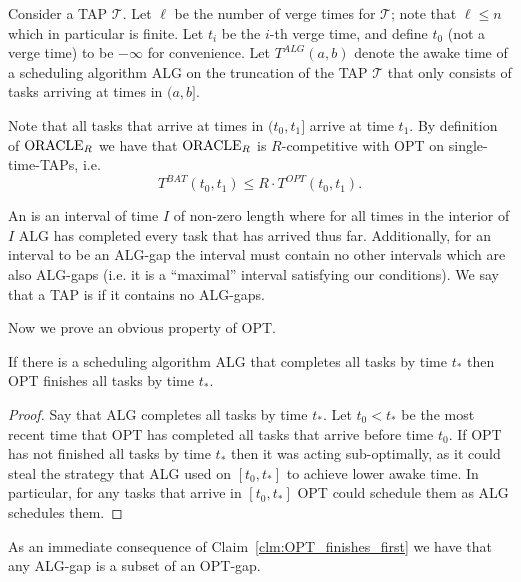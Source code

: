 Consider a TAP $\mathcal{T}$. Let $\ell$ be the number of verge
times for $\mathcal{T}$; note that $\ell \le n$ which in
particular is finite. Let $t_i$ be the $i$-th verge time, and
define $t_0$ (not a verge time) to be $-\infty$ for convenience.
Let $T^{ALG}(a, b)$ denote the awake time of a scheduling algorithm
ALG on the truncation of the TAP $\mathcal{T}$ that only consists
of tasks arriving at times in $(a, b]$.

Note that all tasks that arrive at times in $(t_0, t_1]$ arrive
at time $t_1$. By definition of $\operatorname{\text{ORACLE}}_R$ we have that
$\operatorname{\text{ORACLE}}_R$ is $R$-competitive with OPT on single-time-TAPs, i.e.
\begin{equation}
  \label{eq:same_single}
  T^{BAT}(t_0,t_1) \le R \cdot T^{OPT}(t_0,t_1).
\end{equation}

An  is an interval of time $I$ of non-zero length where for
all times in the interior of $I$ ALG has completed every
task that has arrived thus far. Additionally, for an interval to
be an ALG-gap the interval must contain no other intervals which
are also ALG-gaps (i.e. it is a \enquote{maximal} interval
satisfying our conditions).
We say that a TAP is  if it contains no ALG-gaps.

Now we prove an obvious property of OPT.
\begin{claim}
  \label{clm:OPT_finishes_first}
  If there is a scheduling algorithm ALG that completes all tasks by
  time $t_*$ then OPT finishes all tasks by time $t_*$.
\end{claim}
\begin{proof}
  Say that ALG completes all tasks by time $t_*$. Let $t_0 < t_*$
  be the most recent time that OPT has completed all tasks that
  arrive before time $t_0$. If OPT has not finished all tasks by
  time $t_*$ then it was acting sub-optimally, as it could steal
  the strategy that ALG used on $[t_0, t_*]$ to achieve lower
  awake time. In particular, for any tasks that arrive in $[t_0,
  t_*]$ OPT could schedule them as ALG schedules them. 
\end{proof}
As an immediate consequence of Claim~\ref{clm:OPT_finishes_first}
we have that any ALG-gap is a subset of an OPT-gap.

